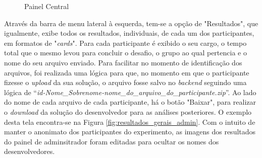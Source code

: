 \documentclass[english,brazilian]{UNISINOSartigo} %
\begin{document}
\begin{figure}[ht]
    \caption{Painel Central}
    \label{fig:painel_central_admin}
    \centering
    \footnotesize
    \begin{minipage}{.9\textwidth}
        \centering
    \end{minipage}
\end{figure}
\FloatBarrier

Através da barra de menu lateral à esquerda, tem-se a opção de "Resultados", que igualmente, exibe todos os resultados, individuais, de cada um dos participantes, em formatos de "\textit{cards}". Para cada participante é exibido o seu cargo, o tempo total que o mesmo levou para concluir o desafio, o grupo ao qual pertencia e o nome do seu arquivo enviado. Para facilitar no momento de identificação dos arquivos, foi realizada uma lógica para que, no momento em que o participante fizesse o \textit{upload} da sua solução, o arquivo fosse salvo no \textit{backend} seguindo uma lógica de ``\textit{id-Nome\_Sobrenome-nome\_do\_arquivo\_do\_participante.zip}''. Ao lado do nome de cada arquivo de cada participante, há o botão "Baixar", para realizar o \textit{download} da solução do desenvolvedor para as análises posteriores. O exemplo desta tela encontra-se na Figura \ref{fig:resultados_gerais_admin}. Com o intuito de manter o anonimato dos participantes do experimento, as imagens dos resultados do painel de adminsitrador foram editadas para ocultar os nomes dos desenvolvedores.
\end{document}
